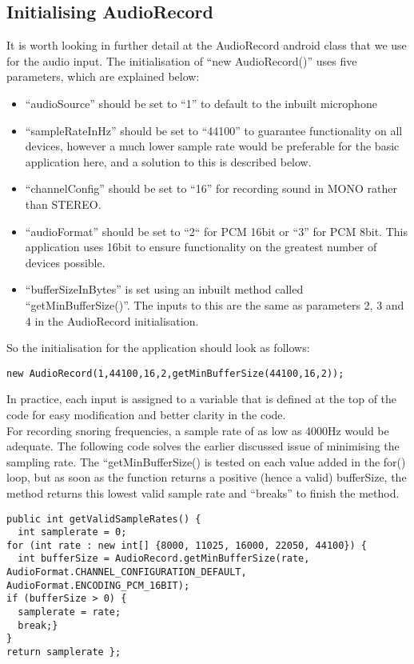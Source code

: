 \subsection{Initialising AudioRecord}
It is worth looking in further detail at the AudioRecord android class that we use for the audio input. The initialisation of “new AudioRecord()” uses five parameters, which are explained below:
\begin{itemize}
\item “audioSource” should be set to “1” to default to the inbuilt microphone
\item “sampleRateInHz” should be set to “44100” to guarantee functionality on all devices, however a much lower sample rate would be preferable for the basic application here, and a solution to this is described below.
\item “channelConfig” should be set to “16” for recording sound in MONO rather than STEREO. 
\item “audioFormat” should be set to “2“ for PCM 16bit or “3” for PCM 8bit. This application uses 16bit to ensure functionality on the greatest number of devices possible.
\item “bufferSizeInBytes” is set using an inbuilt method called “getMinBufferSize()”. The inputs to this are the same as parameters 2, 3 and 4 in the AudioRecord initialisation.
\end{itemize}
So the initialisation for the application should look as follows:
\begin{lstlisting}
new AudioRecord(1,44100,16,2,getMinBufferSize(44100,16,2));
\end{lstlisting}
In practice, each input is assigned to a variable that is defined at the top of the code for easy modification and better clarity in the code.
\\ For recording snoring frequencies, a sample rate of as low as 4000Hz would be adequate. The following code solves the earlier discussed issue of minimising the sampling rate. The “getMinBufferSize() is tested on each value added in the for() loop, but as soon as the function returns a positive (hence a valid) bufferSize, the method returns this lowest valid sample rate and “breaks” to finish the method.
\begin{lstlisting}
public int getValidSampleRates() {
  int samplerate = 0;
for (int rate : new int[] {8000, 11025, 16000, 22050, 44100}) {
  int bufferSize = AudioRecord.getMinBufferSize(rate, AudioFormat.CHANNEL_CONFIGURATION_DEFAULT, AudioFormat.ENCODING_PCM_16BIT);
if (bufferSize > 0) {
  samplerate = rate;
  break;}
}
return samplerate };
\end{lstlisting}
